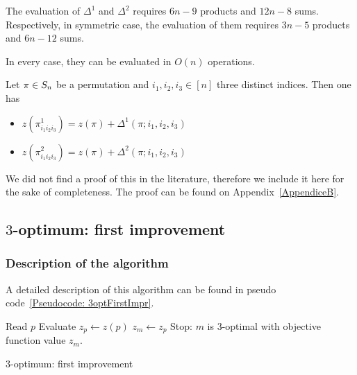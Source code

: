 \begin{oss}
		The evaluation of $\Delta^1$ and $\Delta^2$ requires $6n-9$ products and $12n-8$ sums. Respectively, in symmetric case, the evaluation of them requires $3n-5$ products and $6n-12$ sums.
	
	In every case, they can be evaluated in $O(n)$ operations.
\end{oss}

\begin{teo}
	\label{teo:3optDelta}
Let $\pi \in S_n$ be a permutation and $i_1,i_2,i_3 \in [n]$ three distinct indices.  Then one has
\begin{itemize}
	\item $z\left(\pi^1_{i_1i_2i_3}\right)= z(\pi) +\Delta^1(\pi;i_1,i_2,i_3)$ 
	\item $z\left(\pi^2_{i_1i_2i_3}\right)= z(\pi) +\Delta^2(\pi;i_1,i_2,i_3)$ 
\end{itemize}
\end{teo}

We did not find a proof of this in the literature, therefore we include it here for the sake of completeness. The proof can be found on Appendix~\ref{AppendiceB}.

\newpage
\subsection{$3$-optimum: first improvement}

\subsubsection{Description of the algorithm}
A detailed description of this algorithm can be found in pseudo code~\ref{Pseudocode: 3optFirstImpr}.

\begin{algorithm}[htp]
	Read $p$\;
	Evaluate $z_p \gets z(p)$\;
	$z_m \gets z_p$ \;
	{\label{step:3optbest}
	}
	Stop: $m$ is  $3$-optimal with objective function value $z_m$.
	\caption{$3$-optimum: first improvement}
	\label{Pseudocode: 3optFirstImpr}
\end{algorithm}






